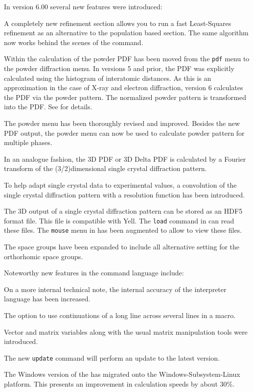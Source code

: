 In \Suite version 6.00 several new features were introduced:

A completely new refinement section \Refine allows you to run a fast
Least-Squares refinement as an alternative to the population based 
\Diffev section.  The same algorithm now works behind the scenes of the
 command.

Within \Discus the calculation of the powder PDF has been moved from 
the {\tt pdf} menu to the powder diffraction  menu. In versions 5 and 
prior, the PDF was explicitly calculated using the histogram of 
interatomic distances. As this is an approximation in the case of 
X-ray and electron diffraction, \Suite version 6 calculates the 
PDF via the powder pattern. The normalized powder pattern is 
transformed into the PDF. See \cite{neder2020} for details.

The powder menu has been thoroughly revised and improved. Besides the
new PDF output, the powder menu can now be used to calculate powder
pattern for multiple phases. 

In an analogue fashion, the 3D PDF or 3D Delta PDF is calculated 
by a Fourier transform of the (3/2)dimensional single crystal 
diffraction pattern.

To help adapt single crystal data to experimental values, a
convolution of the single crystal diffraction pattern with a
resolution function has been introduced.

The 3D output of a single crystal diffraction pattern can be stored as 
an HDF5 format file. This file is compatible with Yell.
The {\tt load} command in \Kuplot can read these files. The 
{\tt mouse} menu in \Kuplot has been augmented to allow to view these
files.

The space groups have been expanded to include all alternative 
setting for the orthorhomic space groups.

Noteworthy new features in the command language include:

On a more internal technical note, the internal accuracy of the
interpreter language has been increased. 
 
The option to use continuations of a long line across 
several lines in a macro.

Vector and matrix variables along with the usual matrix 
manipulation tools were introduced.  

The new {\tt update} command will perform an update to the latest 
version.

The Windows version of the \Suite has migrated onto the
Windows-Subsystem-Linux platform. This presents an improvement
in calculation speeds by about 30\%.

